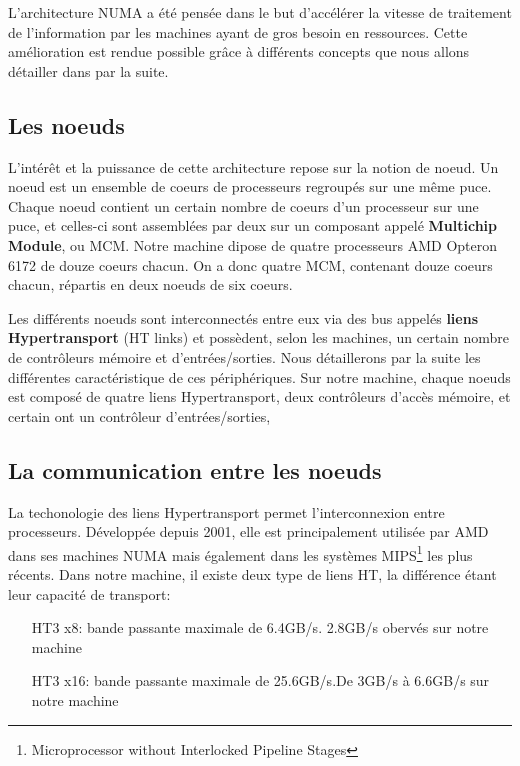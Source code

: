     L'architecture NUMA a été pensée dans le but d'accélérer la vitesse de
    traitement de l'information par les machines ayant de gros besoin en
    ressources. Cette amélioration est rendue possible grâce à différents
    concepts que nous allons détailler dans par la suite.

  \subsection{Les noeuds}

    L'intérêt et la puissance de cette architecture repose sur la notion de \og
    noeud\fg. Un noeud est un ensemble de coeurs de processeurs regroupés sur
    une même puce. Chaque noeud contient un certain nombre de coeurs d'un
    processeur sur une puce, et celles-ci sont assemblées par deux sur un
    composant appelé \textbf{Multichip Module}, ou MCM. Notre machine dipose de
    quatre processeurs AMD Opteron 6172 de douze coeurs chacun. On a donc quatre
    MCM, contenant douze coeurs chacun, répartis en deux noeuds de six
    coeurs.\newline

    Les différents noeuds sont interconnectés entre eux via des bus appelés
    \textbf{liens Hypertransport} (HT links) et possèdent, selon les machines,
    un certain nombre de contrôleurs mémoire et d'entrées/sorties. Nous
    détaillerons par la suite les différentes caractéristique de ces
    périphériques. Sur notre machine, chaque noeuds est composé de quatre liens
    Hypertransport, deux contrôleurs d'accès mémoire, et certain ont un
    contrôleur d'entrées/sorties,


  \subsection{La communication entre les noeuds}

    La techonologie des liens Hypertransport permet l'interconnexion entre
    processeurs. Développée depuis 2001, elle est principalement utilisée par
    AMD dans ses machines NUMA mais également dans les systèmes
    MIPS\footnote{Microprocessor without Interlocked Pipeline Stages} les plus
    récents. Dans notre machine, il existe deux type de liens HT, la différence
    étant leur capacité de transport:

    \begin{itemize}
      \item[HT3 x8:] bande passante maximale de 6.4GB/s. 2.8GB/s obervés sur notre
      machine\cite{Lepers2014}
      \item[HT3 x16:] bande passante maximale de 25.6GB/s.De 3GB/s à 6.6GB/s sur
      notre machine\cite{Lepers2014}
    \end{itemize}

